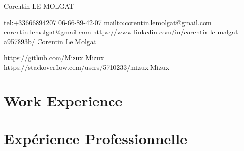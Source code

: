 \documentclass{resume}
\begin{document}
\ContactName
{Corentin LE MOLGAT} %

\iffalse
\ContactInfoPhysical
{51 Rue du Docteur Denoyelle} %
{Tours, Centre, 37000}        %
{France}                      %
\fi

\ContactInfoDigital
  {tel:+33666894207}                    %
  {06-66-89-42-07}                      %
  {mailto:corentin.lemolgat@gmail.com}  %
  {corentin.lemolgat@gmail.com}         %
  {https://www.linkedin.com/in/corentin-le-molgat-a957893b/} %
  {Corentin Le Molgat}                                       %

\ContactDevDigital
  {https://github.com/Mizux} %
  {Mizux}                    %
  {https://stackoverflow.com/users/5710233/mizux} %
  {Mizux}                                         %

 {
  \section{{\faBriefcase} Work Experience}
} {
  \section{{\faBriefcase} Exp\'{e}rience Professionnelle}
}
\end{document}
